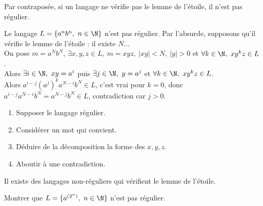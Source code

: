 \documentclass[french, 11pt]{article}
\begin{document}
\vspace*{-0.3cm}

\begin{corr}{}{}
    Par contraposée, si un langage ne vérifie pas le lemme de l'étoile, il n'est pas régulier.
\end{corr}

\vspace*{0.4cm}

\begin{ex}{}{}
    Le langage $L=\{a^nb^n, ~ n \in \N\}$ n'est pas régulier.
    \tcblower
    Par l'absurde, supposons qu'il vérifie le lemme de l'étoile : il existe $N$...\\
    On pose $m=a^Nb^N$, $\exists x,y,z \in L, ~ m = xyz, ~ |xy|<N, ~ |y|>0$ et $\forall k \in \N, ~ xy^kz \in L$.\\
    Alors $\exists i \in \N, ~ xy = a^i$ puis $\exists j \in \N, ~ y = a^j$ et $\forall k \in \N, ~ xy^kz \in L$.\\
    Alors $a^{i-j}(a^{j})^ka^{N-i}b^N \in L$, c'est vrai pour $k=0$, donc $a^{i-j}a^{N-i}b^N=a^{N-j}b^N \in L$, contradiction car $j>0$.
\end{ex}

\vspace*{0.4cm}

\begin{meth}{}{}
    \begin{enumerate}
        \item Supposer le langage régulier.
        \item Considérer un mot qui convient.
        \item Déduire de la décomposition la forme des $x,y,z$.
        \item Aboutir à une contradiction.
    \end{enumerate}
\end{meth}

\vspace*{0.4cm}

\begin{prop}{}{}
    Il existe des langages non-réguliers qui vérifient le lemme de l'étoile.
\end{prop}

\vspace*{0.4cm}

\begin{exercice}{}{}
    Montrer que $L=\{a^{(2^n)}, ~ n\in\N\}$ n'est pas régulier.
\end{exercice}
\end{document}
